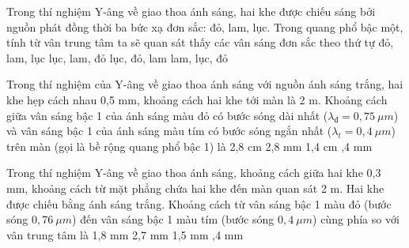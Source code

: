 \begin{vidu}%
Trong thí nghiệm Y-âng về giao thoa ánh sáng, hai khe được chiếu sáng bởi nguồn phát đồng thời ba bức xạ đơn sắc: đỏ, lam, lục. Trong quang phổ bậc một, tính từ vân trung tâm ta sẽ quan sát thấy các vân sáng đơn sắc theo thứ tự
\choice
{đỏ, lam, lục}
{lục, lam, đỏ}
{lục, đỏ, lam}
{\True lam, lục, đỏ}
\end{vidu} 
\begin{vidu}%
Trong thí nghiệm của Y-âng về giao thoa ánh sáng với nguồn ánh sáng trắng, hai khe hẹp cách nhau 0,5 mm, khoảng cách hai khe tới màn là 2 m. Khoảng cách giữa vân sáng bậc 1 của ánh sáng màu đỏ có bước sóng dài nhất ($\lambda_{\text{đ}}=0,75\ \mu m$) và vân sáng bậc 1 của ánh sáng màu tím có bước sóng ngắn nhất ($\lambda_t=0,4\ \mu m $) trên màn (gọi là bề rộng quang phổ bậc 1) là
\choice
{2,8 cm}
{2,8 mm}
{1,4 cm}
{,4 mm}
\end{vidu} 
\begin{vidu}%
Trong thí nghiệm Y-âng về giao thoa ánh sáng, khoảng cách giữa hai khe 0,3 mm, khoảng cách từ mặt phẳng chứa hai khe đến màn quan sát 2 m. Hai khe được chiếu bằng ánh sáng trắng. Khoảng cách từ vân sáng bậc 1 màu đỏ (bước sóng $0,76\ \mu m$) đến vân sáng bậc 1 màu tím (bước sóng $0,4\ \mu m$) cùng phía so với vân trung tâm là
\choice
{1,8 mm}
{2,7 mm}
{1,5 mm}
{,4 mm}
\end{vidu} 
